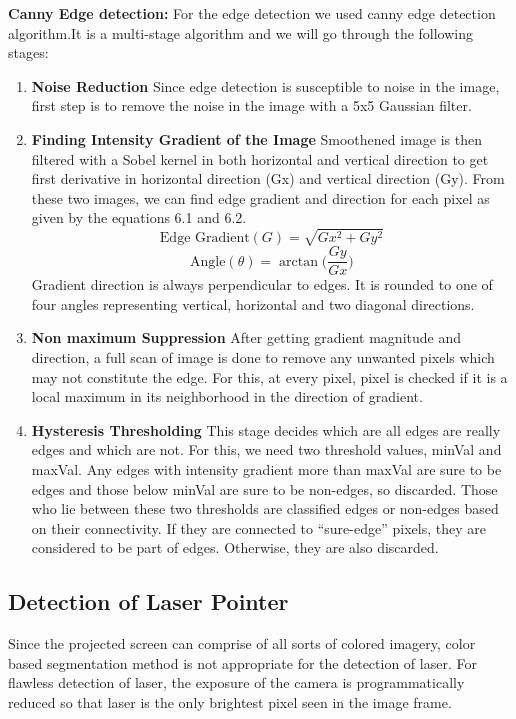 \documentclass[12pt, a4paper]{article}
\begin{document}
\textbf{Canny Edge detection:}
For the edge detection we used canny edge detection algorithm.It is a multi-stage algorithm and we will go through the following stages:
\begin{enumerate}
\item \textbf {Noise Reduction}
Since edge detection is susceptible to noise in the image, first step is to remove the noise in the image with a 5x5 Gaussian filter.

\item \textbf{Finding Intensity Gradient of the Image}
Smoothened image is then filtered with a Sobel kernel in both horizontal and vertical direction to get first derivative in horizontal direction (Gx) and vertical direction (Gy). From these two images, we can find edge gradient and direction for each pixel as given by the equations 6.1 and 6.2.
\begin{equation}
\text{Edge Gradient}(G) = \sqrt{Gx^2 + Gy^2}
\end{equation}
\begin{equation}
\text{Angle}(\theta) = \arctan\bigg(\frac{Gy}{Gx}\bigg)
\end{equation}
Gradient direction is always perpendicular to edges. It is rounded to one of four angles   representing vertical, horizontal and two diagonal directions.
\item \textbf{Non maximum Suppression}
After getting gradient magnitude and direction, a full scan of image is done to remove any unwanted pixels which may not constitute the edge. For this, at every pixel, pixel is checked ­if it is a local maximum in its neighborhood in the direction of gradient.

\item \textbf{Hysteresis Thresholding}
This stage decides which are all edges are really edges and which are not. For this, we need two threshold values, minVal and maxVal. Any edges with intensity gradient more than maxVal are sure to be edges and those below minVal are sure to be non-edges, so discarded. Those who lie between these two thresholds are classified edges or non-edges based on their connectivity. If they are connected to “sure-edge” pixels, they are considered to be part of edges. Otherwise, they are also discarded.
\end{enumerate}
	
\subsection{Detection of Laser Pointer}
	Since the projected screen can comprise of all sorts of colored imagery, color based segmentation method is not appropriate for the detection of laser. For flawless detection of laser, the exposure of the camera is programmatically reduced so that laser is the only brightest pixel seen in the image frame. 
\end{document}
